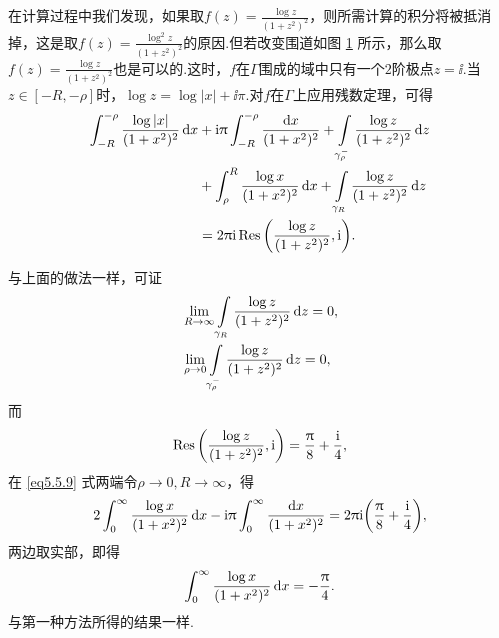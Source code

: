 \begin{solution}
  在计算过程中我们发现，如果取$f(z)=\frac{\log z}{(1+z^2)^2}$，则所需计算的积分将被抵消掉，这是取$f(z)=\frac{\log^2z}{(1+z^2)^2}$的原因.但若改变围道如图 \ref{fig5.5} 所示，那么取$f(z)=\frac{\log z}{(1+z^2)^2}$也是可以的.这时，$f$在$\Gamma$围成的域中只有一个$2$阶极点$z=\ii$.当$z\in[-R,-\rho]$时，$\log z=\log |x|+\ii\pi$.对$f$在$\Gamma$上应用残数定理，可得
  \begin{equation}\label{eq5.5.9}
    \begin{aligned}
      \int_{-R}^{-\rho}\frac{\log|x|}{(1+x^2)^2}\mathop{}\!\mathrm dx&+\mathrm i\uppi\int_{-R}^{-\rho}\frac{\mathop{}\!\mathrm dx}{(1+x^2)^2}
      + \int\limits_{\gamma_\rho^-}\frac{\log z}{(1+z^2)^2}\mathop{}\!\mathrm dz\\
      & + \int_\rho^R\frac{\log x}{(1+x^2)^2}\mathop{}\!\mathrm dx+\int\limits_{\gamma_R}\frac{\log z}{(1+z^2)^2}\mathop{}\!\mathrm dz\\
      & = 2\uppi\mathrm i \operatorname*{Res}\bigg(\frac{\log z}{(1+z^2)^2},\mathrm i\bigg).
    \end{aligned}
  \end{equation}
  \begin{figure}[!ht]
    \centering
    \caption{\label{fig5.5}}
  \end{figure}
  与上面的做法一样，可证
  \begin{align*}
    & \lim_{R\to\infty}\int\limits_{\gamma_R}\frac{\log z}{(1+z^2)^2}\mathop{}\!\mathrm dz=0,\\
    & \lim_{\rho\to0}\int\limits_{\gamma_\rho^-}\frac{\log z}{(1+z^2)^2}\mathop{}\!\mathrm dz=0,
  \end{align*}
  而
  \[
    \operatorname*{Res}\bigg(\frac{\log z}{(1+z^2)^2},\mathrm i\bigg) = \frac{\uppi}8+\frac{\mathrm i}4,
  \]
  在 \eqref{eq5.5.9} 式两端令$\rho\to0,R\to\infty$，得
  \[
    2\int_0^\infty\frac{\log x}{(1+x^2)^2}\mathop{}\!\mathrm dx-\mathrm i\uppi\int_0^\infty\frac{\mathop{}\!\mathrm dx}{(1+x^2)^2}
    = 2\uppi\mathrm i\bigg(\frac{\uppi}8+\frac{\mathrm i}4\bigg),
  \]
  两边取实部，即得
  \[
    \int_0^\infty\frac{\log x}{(1+x^2)^2}\mathop{}\!\mathrm dx = -\frac{\uppi}4.
  \]
  与第一种方法所得的结果一样.
\end{solution}

